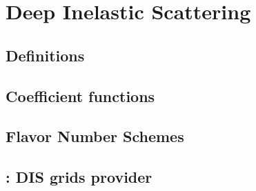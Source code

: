 
\chapter{Deep Inelastic Scattering}
\label{ch:dis}
\minitoc
\adjustmtc



\section{Definitions}
\label{sec:dis/defs}


\section{Coefficient functions}
\label{sec:dis/coeffs}


\section{Flavor Number Schemes}
\label{sec:dis/fns}


\section{\yadism: DIS grids provider}
\label{sec:dis/yadism}

